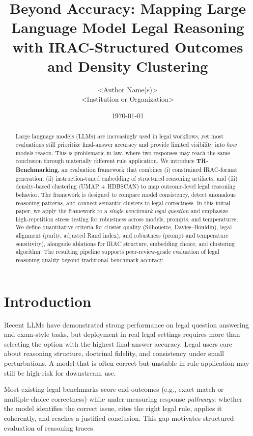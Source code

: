 \documentclass[11pt]{article}
\title{Beyond Accuracy: Mapping Large Language Model Legal Reasoning with IRAC-Structured Outcomes and Density Clustering}
\author{<Author Name(s)> \\ <Institution or Organization>}
\date{\today}
\begin{document}
\maketitle

\begin{abstract}
Large language models (LLMs) are increasingly used in legal workflows, yet most evaluations still prioritize final-answer accuracy and provide limited visibility into \emph{how} models reason. This is problematic in law, where two responses may reach the same conclusion through materially different rule application. We introduce \textbf{TR-Benchmarking}, an evaluation framework that combines (i) constrained IRAC-format generation, (ii) instruction-tuned embedding of structured reasoning artifacts, and (iii) density-based clustering (UMAP + HDBSCAN) to map outcome-level legal reasoning behavior. The framework is designed to compare model consistency, detect anomalous reasoning patterns, and connect semantic clusters to legal correctness. In this initial paper, we apply the framework to a \emph{single benchmark legal question} and emphasize high-repetition stress testing for robustness across models, prompts, and temperatures. We define quantitative criteria for cluster quality (Silhouette, Davies--Bouldin), legal alignment (purity, adjusted Rand index), and robustness (prompt and temperature sensitivity), alongside ablations for IRAC structure, embedding choice, and clustering algorithm. The resulting pipeline supports peer-review-grade evaluation of legal reasoning quality beyond traditional benchmark accuracy.
\end{abstract}

\section{Introduction}
Recent LLMs have demonstrated strong performance on legal question answering and exam-style tasks, but deployment in real legal settings requires more than selecting the option with the highest final-answer accuracy. Legal users care about reasoning structure, doctrinal fidelity, and consistency under small perturbations. A model that is often correct but unstable in rule application may still be high-risk for downstream use.

Most existing legal benchmarks score end outcomes (e.g., exact match or multiple-choice correctness) while under-measuring response \emph{pathways}: whether the model identifies the correct issue, cites the right legal rule, applies it coherently, and reaches a justified conclusion. This gap motivates structured evaluation of reasoning traces.
\end{document}
